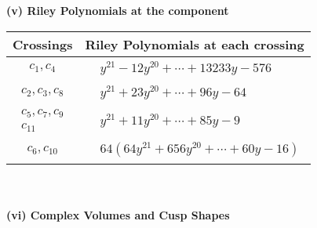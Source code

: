 \documentclass[1p]{elsarticle_modified}
\theoremstyle{definition}
\begin{document}
\newpage\renewcommand{\arraystretch}{1}
\flushleft \textbf{(v) Riley Polynomials at the component}\newline \\
\begin{tabular}{m{50pt}|m{274pt}}
Crossings & \hspace{64pt}Riley Polynomials at each crossing \\
\hline $$\begin{aligned}c_{1},c_{4}\end{aligned}$$&$\begin{aligned}
&y^{21}-12 y^{20}+\cdots+13233 y-576
\end{aligned}$\\
\hline $$\begin{aligned}c_{2},c_{3},c_{8}\end{aligned}$$&$\begin{aligned}
&y^{21}+23 y^{20}+\cdots+96 y-64
\end{aligned}$\\
\hline $$\begin{aligned}c_{5},c_{7},c_{9}\\c_{11}\end{aligned}$$&$\begin{aligned}
&y^{21}+11 y^{20}+\cdots+85 y-9
\end{aligned}$\\
\hline $$\begin{aligned}c_{6},c_{10}\end{aligned}$$&$\begin{aligned}
&64(64 y^{21}+656 y^{20}+\cdots+60 y-16)
\end{aligned}$\\
\hline
\end{tabular}\\~\\
\newpage\flushleft \textbf{(vi) Complex Volumes and Cusp Shapes}
\end{document}
